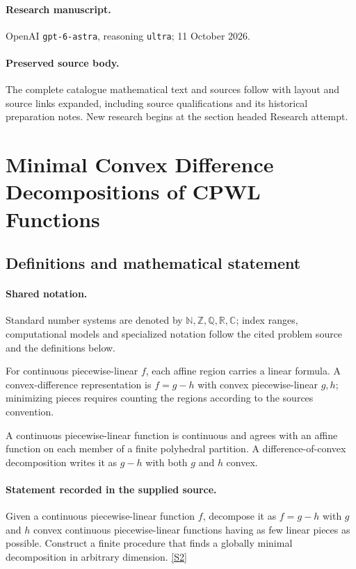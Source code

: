 \documentclass[11pt]{article}
\begin{document}
\paragraph{Research manuscript.} OpenAI \texttt{gpt-6-astra}, reasoning \texttt{ultra}; 11 October 2026.
\paragraph{Preserved source body.} The complete catalogue mathematical text and sources follow with layout and source links expanded, including source qualifications and its historical preparation notes. New research begins at the section headed Research attempt.

\section{Minimal Convex Difference Decompositions of CPWL Functions}\label{statement}

\subsection{Definitions and mathematical statement}

\paragraph{Shared notation.}Standard number systems are denoted by $\mathbb N,\mathbb Z,\mathbb Q,\mathbb R,\mathbb C$; index ranges, computational models and specialized notation follow the cited problem source and the definitions below.


For continuous piecewise-linear $f$, each affine region carries a linear formula. A convex-difference representation is $f=g-h$ with convex piecewise-linear $g,h$; minimizing pieces requires counting the regions according to the source\textquotesingle s convention.

A continuous piecewise-linear function is continuous and agrees with an affine function on each member of a finite polyhedral partition. A difference-of-convex decomposition writes it as $g-h$ with both $g$ and $h$ convex.
\paragraph{Statement recorded in the supplied source.}
Given a continuous piecewise-linear function $f$, decompose it as $f=g-h$ with $g$ and $h$ convex continuous piecewise-linear functions having as few linear pieces as possible. Construct a finite procedure that finds a globally minimal decomposition in arbitrary dimension. \href{https://doi.org/10.4171/owr/2025/12}{[S2]}
\end{document}
